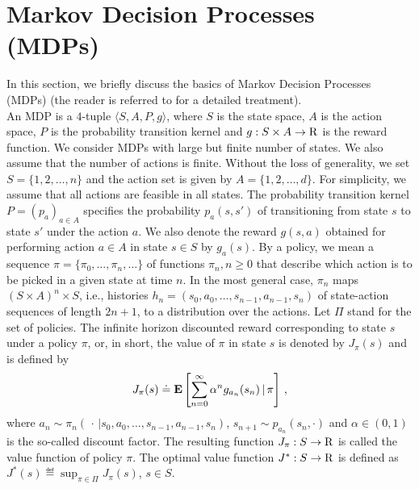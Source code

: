 \section{Markov Decision Processes (MDPs)}
In this section, we briefly discuss the basics of Markov Decision Processes (MDPs) (the reader is referred to \cite{BertB,Puter} for a detailed treatment).\\
An MDP is a $4$-tuple $\langle S,A,P,g\rangle$, where $S$ is the state space, $A$ is the action space, $P$ is the probability transition kernel and $g:S\times A \to \mathrm{R}$ is the reward function. We consider MDPs with large but finite number of states. We also assume that the number of actions is finite.
Without the loss of generality, we set  $S=\{1,2,\ldots,n\}$  and the action set is given by $A=\{1,2,\ldots,d\}$. For simplicity, we assume that all actions are feasible in all states. 
The probability transition kernel $P= (p_a)_{a\in A}$ specifies the probability $p_a(s,s')$ of transitioning from state $s$ to state $s'$ under the action $a$. 
We also denote the reward $g(s,a)$ obtained for performing action $a\in A$ in state $s\in S$ by $g_a(s)$.
By a policy, we mean a sequence $\pi=\{\pi_0,\ldots,\pi_n,\ldots\}$ of functions $\pi_n, n\geq 0$ 
	that describe which action is to be picked in a given state at time $n$. 
In the most general case, $\pi_n$ maps $(S \times A)^n \times S$, i.e., 
	histories $h_n =(s_0,a_0,\dots,s_{n-1},a_{n-1},s_n)$ 
	of state-action sequences of length $2n+1$, to a distribution over the actions. 
Let $\Pi$ stand for the set of policies. 
The infinite horizon discounted reward corresponding to state $s$ under a policy $\pi$,
	or, in short, the value of $\pi$ in state $s$
	is denoted by $J_\pi(s)$ and is defined by 
\begin{align}
J_\pi(s) \eqdef
	\E\left[\sum_{n=0}^\infty \alpha^n g_{a_n}(s_n)\,\Large|\,\pi\right]\,,\nn
\end{align}
	where $a_{n} \sim \pi_n(\,\cdot\,|s_0,a_0,\dots,s_{n-1},a_{n-1},s_n)$, $s_{n+1} \sim p_{a_n}(s_n,\cdot)$ 
	and $\alpha \in (0,1)$ is the so-called discount factor. 
The resulting function $J_\pi:S\to \mathrm{R}$ is called the value function of policy $\pi$.	
 The optimal value function $J^*:S\to \mathrm{R}$ is defined as $J^*(s) \eqdef
 \sup_{\pi\in\Pi} J_\pi(s)$, $s\in S$.
 
